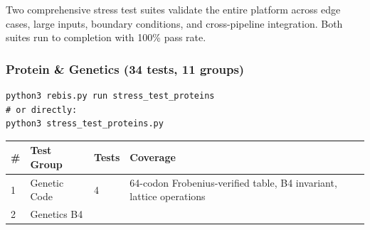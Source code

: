 \documentclass[12pt,a4paper]{article}
\begin{document}
Two comprehensive stress test suites validate the entire platform across
edge cases, large inputs, boundary conditions, and cross-pipeline
integration. Both suites run to completion with 100\% pass rate.

\hypertarget{protein-genetics-34-tests-11-groups}{%
\subsubsection{Protein \& Genetics (34 tests, 11
groups)}\label{protein-genetics-34-tests-11-groups}}

\begin{verbatim}
python3 rebis.py run stress_test_proteins
# or directly:
python3 stress_test_proteins.py
\end{verbatim}

\begin{longtable}[]{@{}llll@{}}
\toprule
\begin{minipage}[b]{0.09\columnwidth}\raggedright
\#\strut
\end{minipage} & \begin{minipage}[b]{0.31\columnwidth}\raggedright
Test Group\strut
\end{minipage} & \begin{minipage}[b]{0.20\columnwidth}\raggedright
Tests\strut
\end{minipage} & \begin{minipage}[b]{0.29\columnwidth}\raggedright
Coverage\strut
\end{minipage}\tabularnewline
\midrule
\endhead
\begin{minipage}[t]{0.09\columnwidth}\raggedright
1\strut
\end{minipage} & \begin{minipage}[t]{0.31\columnwidth}\raggedright
Genetic Code\strut
\end{minipage} & \begin{minipage}[t]{0.20\columnwidth}\raggedright
4\strut
\end{minipage} & \begin{minipage}[t]{0.29\columnwidth}\raggedright
64-codon Frobenius-verified table, B4 invariant, lattice
operations\strut
\end{minipage}\tabularnewline
\begin{minipage}[t]{0.09\columnwidth}\raggedright
2\strut
\end{minipage} & \begin{minipage}[t]{0.31\columnwidth}\raggedright
Genetics B4\strut
\end{minipage} & \begin{minipage}[t]{0.20\columnwidth}\raggedright

\end{minipage}
\end{longtable}
\end{document}
